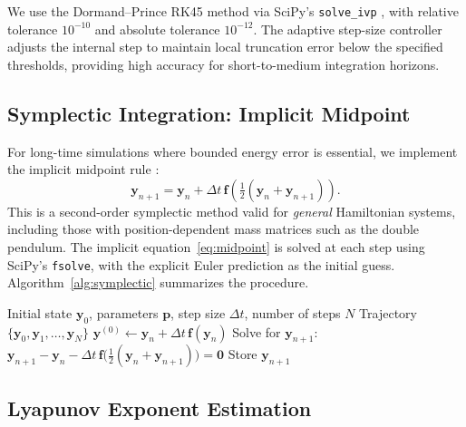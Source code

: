 \documentclass[11pt,a4paper]{article}
\newcommand{\dt}{\Delta t}
\newcommand{\vect}[1]{\boldsymbol{#1}}
\begin{document}
We use the Dormand--Prince RK45 method via SciPy's \texttt{solve\_ivp}
\citep{hairer2006geometric}, with relative tolerance $10^{-10}$ and absolute
tolerance $10^{-12}$. The adaptive step-size controller adjusts the internal
step to maintain local truncation error below the specified thresholds,
providing high accuracy for short-to-medium integration horizons.

\subsection{Symplectic Integration: Implicit Midpoint}

For long-time simulations where bounded energy error is essential, we implement
the implicit midpoint rule \citep{hairer2003geometric}:
\begin{equation}
  \vect{y}_{n+1} = \vect{y}_n + \dt\,\vect{f}\!\left(
    \tfrac{1}{2}(\vect{y}_n + \vect{y}_{n+1})\right).
  \label{eq:midpoint}
\end{equation}
This is a second-order symplectic method valid for \emph{general} Hamiltonian
systems, including those with position-dependent mass matrices such as the
double pendulum. The implicit equation~\eqref{eq:midpoint} is solved at each
step using SciPy's \texttt{fsolve}, with the explicit Euler prediction as
the initial guess. Algorithm~\ref{alg:symplectic} summarizes the procedure.

\begin{algorithm}[htbp]
\caption{Implicit midpoint symplectic integrator}
\label{alg:symplectic}
\begin{algorithmic}[1]
\REQUIRE Initial state $\vect{y}_0$, parameters $\vect{p}$, step size $\dt$,
         number of steps $N$
\ENSURE Trajectory $\{\vect{y}_0, \vect{y}_1, \ldots, \vect{y}_N\}$
  \STATE $\vect{y}^{(0)} \gets \vect{y}_n + \dt\,\vect{f}(\vect{y}_n)$
  \STATE Solve for $\vect{y}_{n+1}$:
         $\vect{y}_{n+1} - \vect{y}_n
           - \dt\,\vect{f}\!\bigl(\tfrac{1}{2}(\vect{y}_n + \vect{y}_{n+1})\bigr) = \vect{0}$
  \STATE Store $\vect{y}_{n+1}$
\ENDFOR
\end{algorithmic}
\end{algorithm}

\subsection{Lyapunov Exponent Estimation}
\end{document}
